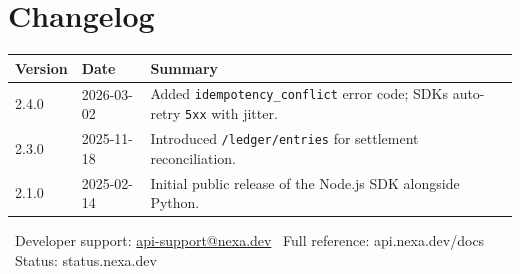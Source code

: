 \documentclass[10pt]{article}
\begin{document}
\section{Changelog}

\renewcommand{\arraystretch}{1.15}
\begin{tabularx}{\textwidth}{@{}l l X@{}}
\toprule
\textbf{Version} & \textbf{Date} & \textbf{Summary} \\
\midrule
2.4.0 & 2026-03-02 & Added \texttt{idempotency\_conflict} error code; SDKs auto-retry \texttt{5xx} with jitter. \\
2.3.0 & 2025-11-18 & Introduced \texttt{/ledger/entries} for settlement reconciliation. \\
2.1.0 & 2025-02-14 & Initial public release of the Node.js SDK alongside Python. \\
\bottomrule
\end{tabularx}

\vspace{2mm}
\begin{tcolorbox}[
  enhanced, colback=nexanavy, colframe=nexanavy, arc=3pt, boxrule=0pt,
  left=5mm, right=5mm, top=3mm, bottom=3mm
]
\centering
{\color{white}\small\sffamily
\faLifeRing\ Developer support: \href{mailto:api-support@nexa.dev}{api-support@nexa.dev}
\quad\textbar\quad \faBook\ Full reference: api.nexa.dev/docs
\quad\textbar\quad \faComments\ Status: status.nexa.dev}
\end{tcolorbox}
\end{document}
